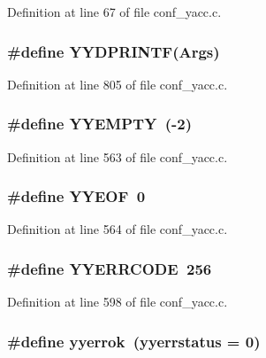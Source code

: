 Definition at line 67 of file conf\_\-yacc.c.
\subsubsection[{YYDPRINTF}]{\setlength{\rightskip}{0pt plus 5cm}\#define YYDPRINTF(Args)}\label{conf__yacc_8c_f6d6ca80e87922f90264f1a4a802ea04}




Definition at line 805 of file conf\_\-yacc.c.
\subsubsection[{YYEMPTY}]{\setlength{\rightskip}{0pt plus 5cm}\#define YYEMPTY~(-2)}\label{conf__yacc_8c_e59196b3765411a06cf234cf9bcae2e7}




Definition at line 563 of file conf\_\-yacc.c.
\subsubsection[{YYEOF}]{\setlength{\rightskip}{0pt plus 5cm}\#define YYEOF~0}\label{conf__yacc_8c_3b1e3628411fabac03abe0a337322016}




Definition at line 564 of file conf\_\-yacc.c.
\subsubsection[{YYERRCODE}]{\setlength{\rightskip}{0pt plus 5cm}\#define YYERRCODE~256}\label{conf__yacc_8c_552f295255821fa7dea11b0237e1d61a}




Definition at line 598 of file conf\_\-yacc.c.
\subsubsection[{yyerrok}]{\setlength{\rightskip}{0pt plus 5cm}\#define yyerrok~(yyerrstatus = 0)}\label{conf__yacc_8c_20bf055e53dc4fd5afddfd752a4d1adb}




